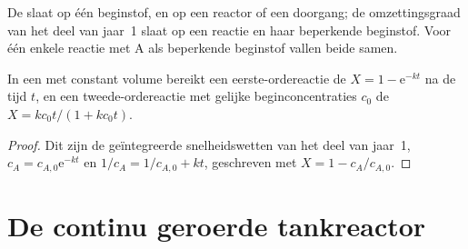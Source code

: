 De  slaat op één beginstof, en op een reactor of een doorgang; de
omzettingsgraad van het deel van jaar~1 slaat op een reactie en haar
beperkende beginstof. Voor één enkele reactie met A als beperkende beginstof
vallen beide samen.

\begin{proposition}[Batchreactor]\label{prop:b2:continuous-reactors:batch}
In een  met constant volume bereikt een eerste-ordereactie de
 $X = 1 - \mathrm e^{-kt}$ na de tijd $t$, en een tweede-ordereactie
met gelijke beginconcentraties $c_0$ de  $X =
kc_0t/(1 + kc_0t)$.
\end{proposition}

\begin{proof}
Dit zijn de geïntegreerde snelheidswetten van het deel van jaar~1, $c_A = c_{A,0}
\mathrm e^{-kt}$ en $1/c_A = 1/c_{A,0} + kt$, geschreven met $X = 1 -
c_A/c_{A,0}$.
\end{proof}

\section{De continu geroerde tankreactor}

